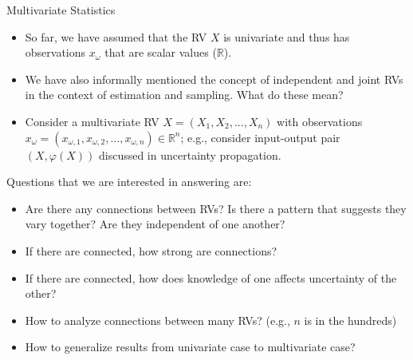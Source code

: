 \documentclass[9pt]{beamer}
\begin{document}
%
\begin{frame}{Multivariate Statistics}

\begin{itemize}
\item So far, we have assumed that the RV $X$ is univariate and thus has observations $x_\omega$ that are scalar values ($\mathbb{R}$).  

\item We have also informally mentioned the concept of independent and joint RVs in the context of estimation and sampling.  What do these mean?

\item Consider a multivariate RV $X=(X_1,X_2,...,X_n)$ with observations $x_\omega=(x_{\omega,1},x_{\omega,2},...,x_{\omega,n})\in \mathbb{R}^n$; e.g., consider input-output pair $(X,\varphi(X))$ discussed in uncertainty propagation.
 
\end{itemize}

Questions that we are interested in answering are:
\begin{block}{}
\begin{itemize}
\item Are there any connections between RVs? Is there a pattern that suggests they vary together? Are they independent of one another?
\item If there are connected, how strong are connections?
\item If there are connected, how does knowledge of one affects uncertainty of the other? 
\item How to analyze connections between many RVs? (e.g., $n$ is in the hundreds)
\item How to generalize results from univariate case to multivariate case? 
\end{itemize}
\end{block}

\end{frame}
\end{document}
